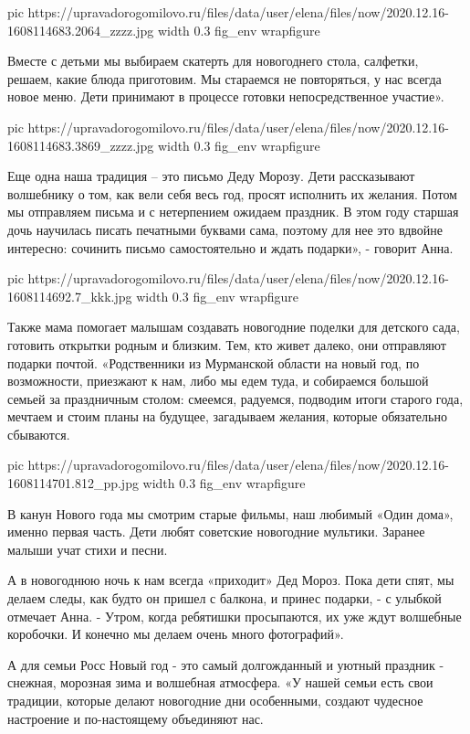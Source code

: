 \ifcmt
  pic https://upravadorogomilovo.ru/files/data/user/elena/files/now/2020.12.16-1608114683.2064_zzzz.jpg
  width 0.3
  fig_env wrapfigure
\fi


Вместе с детьми мы выбираем скатерть для новогоднего стола, салфетки, решаем,
какие блюда приготовим. Мы стараемся не повторяться, у нас всегда новое меню.
Дети принимают в процессе готовки непосредственное участие».

\ifcmt
  pic https://upravadorogomilovo.ru/files/data/user/elena/files/now/2020.12.16-1608114683.3869_zzzz.jpg
  width 0.3
  fig_env wrapfigure
\fi


Еще одна наша традиция – это письмо Деду Морозу. Дети рассказывают волшебнику о
том, как вели себя весь год, просят исполнить их желания.  Потом мы отправляем
письма и с нетерпением ожидаем праздник. В этом году старшая дочь научилась
писать печатными буквами сама, поэтому для нее это вдвойне интересно: сочинить
письмо самостоятельно и ждать подарки», - говорит Анна.

\ifcmt
  pic https://upravadorogomilovo.ru/files/data/user/elena/files/now/2020.12.16-1608114692.7_kkk.jpg
  width 0.3
  fig_env wrapfigure
\fi


Также мама помогает малышам создавать новогодние поделки для детского сада,
готовить открытки родным и близким. Тем, кто живет далеко, они отправляют
подарки почтой. «Родственники из Мурманской области на новый год, по
возможности, приезжают к нам, либо мы едем туда, и собираемся большой семьей за
праздничным столом: смеемся, радуемся, подводим итоги старого года, мечтаем и
стоим планы на будущее, загадываем желания, которые обязательно сбываются.

\ifcmt
  pic https://upravadorogomilovo.ru/files/data/user/elena/files/now/2020.12.16-1608114701.812_pp.jpg
  width 0.3
  fig_env wrapfigure
\fi


В канун Нового года мы смотрим старые фильмы, наш любимый «Один дома», именно
первая часть. Дети любят советские новогодние мультики. Заранее малыши учат
стихи и песни.

А в новогоднюю ночь к нам всегда «приходит» Дед Мороз. Пока дети спят, мы
делаем следы, как будто он пришел с балкона, и принес подарки, - с улыбкой
отмечает Анна. - Утром, когда ребятишки просыпаются, их уже ждут волшебные
коробочки. И конечно мы делаем очень много фотографий».

А для семьи Росс Новый год - это самый долгожданный и уютный праздник -
снежная, морозная зима и волшебная атмосфера. «У нашей семьи есть свои
традиции, которые делают новогодние дни особенными, создают чудесное настроение
и по-настоящему объединяют нас.

